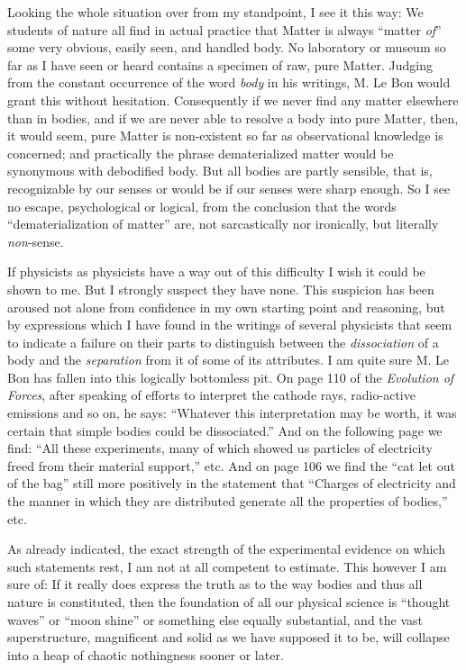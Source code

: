 \documentclass[a4paper, 11pt, oneside, polutonikogreek, english, landscape]{article}
\begin{document}
Looking the whole situation over from my standpoint, I see it this way: We students of nature all find in actual practice that Matter is always ``matter \emph{of}'' some very obvious, easily seen, and handled body. No laboratory or museum so far as I have seen or heard contains a specimen of raw, pure Matter. Judging from the constant occurrence of the word \emph{body} in his writings, M. Le Bon would grant this without hesitation. Consequently if we never find any matter elsewhere than in bodies, and if we are never able to resolve a body into pure Matter, then, it would seem, pure Matter is non-existent so far as observational knowledge is concerned; and practically the phrase dematerialized matter would be synonymous with debodified body. But all bodies are partly sensible, that is, recognizable by our senses or would be if our senses were sharp enough. So I see no escape, psychological or logical, from the conclusion that the words ``dematerialization of matter'' are, not sarcastically nor ironically, but literally \emph{non}-sense.

If physicists as physicists have a way out of this difficulty I wish it could be shown to me. But I strongly suspect they have none. This suspicion has been aroused not alone from confidence in my own starting point and reasoning, but by expressions which I have found in the writings of several physicists that seem to indicate a failure on their parts to distinguish between the \emph{dissociation} of a body and the \emph{separation} from it of some of its attributes. I am quite sure M. Le Bon has fallen into this logically bottomless pit. On page 110 of the \emph{Evolution of Forces}, after speaking of efforts to interpret the cathode rays, radio-active emissions and so on, he says: ``Whatever this interpretation may be worth, it was certain that simple bodies could be dissociated.'' And on the following page we find: ``All these experiments, many of which showed us particles of electricity freed from their material support,'' etc. And on page 106 we find the ``cat let out of the bag'' still more positively in the statement that ``Charges of electricity and the manner in which they are distributed generate all the properties of bodies,'' etc.

As already indicated, the exact strength of the experimental evidence on which such statements rest, I am not at all competent to estimate. This however I am sure of: If it really does express the truth as to the way bodies and thus all nature is constituted, then the foundation of all our physical science is ``thought waves'' or ``moon shine'' or something else equally substantial, and the vast superstructure, magnificent and solid as we have supposed it to be, will collapse into a heap of chaotic nothingness sooner or later.
\end{document}
